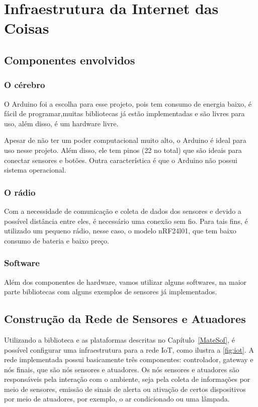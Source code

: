 %
\chapter{Infraestrutura da Internet das Coisas}


\section{Componentes envolvidos}

\subsection{O cérebro}

O Arduino foi a escolha para esse projeto, pois tem consumo de energia baixo, é fácil de programar,muitas bibliotecas já estão implementadas e são livres para uso, além disso, é um hardware livre. 

Apesar de não ter um poder computacional muito alto, o Arduino é ideal para uso nesse projeto. Além disso, ele tem pinos (22 no total) que são ideais para conectar sensores e botões. Outra característica é que o Arduino não possui sistema operacional.

\subsection{O rádio}

Com a necessidade de comunicação e coleta de dados dos sensores e devido a possível distância entre eles, é necessário uma conexão sem fio. Para tais fins, é utilizado um pequeno rádio, nesse caso, o modelo nRF24l01, que tem baixo consumo de bateria e baixo preço.

\subsection{Software}

Além dos componentes de hardware, vamos utilizar alguns softwares, na maior parte bibliotecas com alguns exemplos de sensores já implementados. 

\section{Construção da Rede de Sensores e Atuadores}

Utilizando a biblioteca e as plataformas descritas no Capítulo~\ref{MateSof}, é possível configurar uma infraestrutura para a rede IoT, como ilustra a \ref{fig:iot}. A rede implementada possui
basicamente três componentes:
controlador, gateway e nós finais, que são nós sensores e atuadores. Os nós sensores e atuadores são responsáveis
pela interação com o ambiente, seja pela coleta de informações por meio de sensores, emissão de sinais de alerta ou ativação de certos dispositivos por meio de atuadores, por
exemplo, o ar condicionado ou uma lâmpada.

